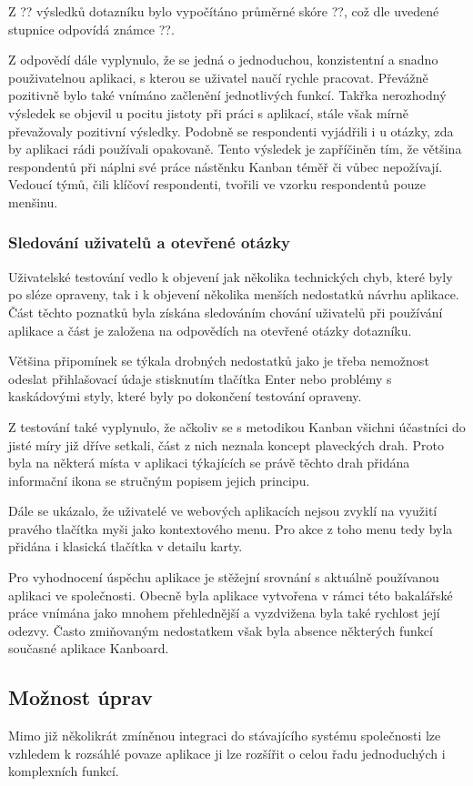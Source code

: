 Z ?? výsledků dotazníku bylo vypočítáno průměrné skóre ??, což dle uvedené stupnice odpovídá známce ??.

Z odpovědí dále vyplynulo, že se jedná o jednoduchou, konzistentní a snadno použivatelnou aplikaci, s kterou se uživatel naučí rychle pracovat. Převážně pozitivně bylo také vnímáno začlenění jednotlivých funkcí. Takřka nerozhodný výsledek se objevil u pocitu jistoty při práci s aplikací, stále však mírně převažovaly pozitivní výsledky. Podobně se respondenti vyjádřili i u otázky, zda by aplikaci rádi používali opakovaně. Tento výsledek je zapříčiněn tím, že většina respondentů při náplni své práce nástěnku Kanban téměř či vůbec nepožívají. Vedoucí týmů, čili klíčoví respondenti, tvořili ve vzorku respondentů pouze menšinu.


\subsubsection{Sledování uživatelů a otevřené otázky}
Uživatelské testování vedlo k objevení jak několika technických chyb, které byly po sléze opraveny, tak i k objevení několika menších nedostatků návrhu aplikace. Část těchto poznatků byla získána sledováním chování uživatelů při používání aplikace a část je založena na odpovědích na otevřené otázky dotazníku. 

Většina připomínek se týkala drobných nedostatků jako je třeba nemožnost odeslat přihlašovací údaje stisknutím tlačítka Enter nebo problémy s kaskádovými styly, které byly po dokončení testování opraveny.

Z testování také vyplynulo, že ačkoliv se s metodikou Kanban všichni účastníci do jisté míry již dříve setkali, část z nich neznala koncept plaveckých drah. Proto byla na některá místa v aplikaci týkajících se právě těchto drah přidána informační ikona se stručným popisem jejich principu.

Dále se ukázalo, že uživatelé ve webových aplikacích nejsou zvyklí na využití pravého tlačítka myši jako kontextového menu. Pro akce z toho menu tedy byla přidána i klasická tlačítka v detailu karty. 

Pro vyhodnocení úspěchu aplikace je stěžejní srovnání s aktuálně používanou aplikaci ve společnosti. Obecně byla aplikace vytvořena v rámci této bakalářské práce vnímána jako mnohem přehlednější a vyzdvižena byla také rychlost její odezvy. Často zmiňovaným nedostatkem však byla absence některých funkcí současné aplikace Kanboard.

\subsection{Možnost úprav}
Mimo již několikrát zmíněnou integraci do stávajícího systému společnosti lze vzhledem k rozsáhlé povaze aplikace ji lze rozšířit o celou řadu jednoduchých i komplexních funkcí.

